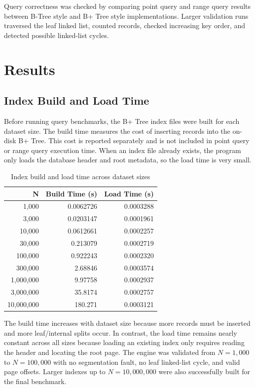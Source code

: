 \documentclass[12pt,a4paper]{article}
\begin{document}
Query correctness was checked by comparing point query and range query results between B-Tree style and B+ Tree style implementations. Larger validation runs traversed the leaf linked list, counted records, checked increasing key order, and detected possible linked-list cycles.

\section{Results}

\subsection{Index Build and Load Time}

Before running query benchmarks, the B+ Tree index files were built for each dataset size. The build time measures the cost of inserting records into the on-disk B+ Tree. This cost is reported separately and is not included in point query or range query execution time. When an index file already exists, the program only loads the database header and root metadata, so the load time is very small.

\begin{table}[H]
\centering
\caption{Index build and load time across dataset sizes}
\begin{tabular}{r r r}
\toprule
\textbf{N} & \textbf{Build Time (s)} & \textbf{Load Time (s)} \\
\midrule
1,000 & 0.0062726 & 0.0003288 \\
3,000 & 0.0203147 & 0.0001961 \\
10,000 & 0.0612661 & 0.0002257 \\
30,000 & 0.213079 & 0.0002719 \\
100,000 & 0.922243 & 0.0002320 \\
300,000 & 2.68846 & 0.0003574 \\
1,000,000 & 9.97758 & 0.0002937 \\
3,000,000 & 35.8174 & 0.0002757 \\
10,000,000 & 180.271 & 0.0003121 \\
\bottomrule
\end{tabular}
\end{table}

The build time increases with dataset size because more records must be inserted and more leaf/internal splits occur. In contrast, the load time remains nearly constant across all sizes because loading an existing index only requires reading the header and locating the root page. The engine was validated from $N=1{,}000$ to $N=100{,}000$ with no segmentation fault, no leaf linked-list cycle, and valid page offsets. Larger indexes up to $N=10{,}000{,}000$ were also successfully built for the final benchmark.
\end{document}

